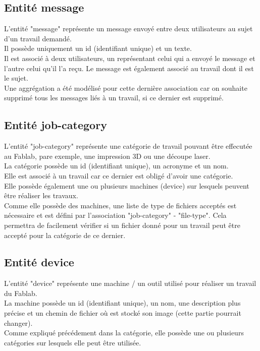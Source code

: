 \documentclass[
    iai, %
    il, %
]{heig-tb}
\begin{document}
\subsection{Entité message}
L'entité "message" représente un message envoyé entre deux utilisateurs au sujet d'un travail demandé.\\
Il possède uniquement un id (identifiant unique) et un texte.\\
Il est associé à deux utilisateurs, un représentant celui qui a envoyé le message et l'autre celui qu'il l'a reçu. Le message est également associé au travail dont il est le sujet.\\
Une aggrégation a été modélisé pour cette dernière association car on souhaite supprimé tous les messages liés à un travail, si ce dernier est supprimé.

\subsection{Entité job-category}
L'entité "job-category" représente une catégorie de travail pouvant être effecutée au Fablab, pare exemple, une impression 3D ou une découpe laser.\\
La catégorie possède un id (identifiant unique), un acronyme et un nom.\\
Elle est associé à un travail car ce dernier est obligé d'avoir une catégorie.\\
Elle possède également une ou plusieurs machines (device) sur lesquels peuvent être réaliser les travaux.\\
Comme elle possède des machines, une liste de type de fichiers acceptés est nécessaire et est défini par l'association "job-category" - "file-type". Cela permettra de facilement vérifier si un fichier donné pour un travail peut être accepté pour la catégorie de ce dernier.

\subsection{Entité device}
L'entité "device" représente une machine / un outil utilisé pour réaliser un travail du Fablab.\\
La machine possède un id (identifiant unique), un nom, une description plus précise et un chemin de fichier où est stocké son image (cette partie pourrait changer).\\
Comme expliqué précédement dans la catégorie, elle possède une ou plusieurs catégories sur lesquels elle peut être utilisée.\\
\end{document}
